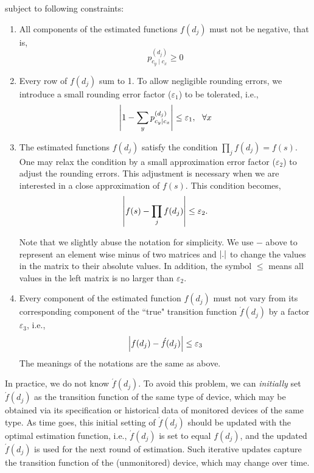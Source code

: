 subject to following constraints:
\begin{enumerate}\itemsep0.5em
\item All components of the estimated functions $f(d_j)$ must not be negative, that is,
\begin{equation}
 p_{c_y \mid c_x}^{(d_j)} \geq 0
\end{equation}
\item Every row of $f(d_j)$ sum to 1. To allow negligible rounding errors, we introduce a small rounding error factor ($\varepsilon_1$) to be tolerated, i.e., 
\begin{equation}
	\left| 1 - \sum_y  p_{c_y \mid c_x}^{(d_j)} \right| \leq \varepsilon_1, \ \ \forall x \label{cons2}
\end{equation}

\item The estimated functions $f(d_j)$ satisfy the condition $\prod_j f(d_j) = f(s)$. One may relax the condition by a small approximation error factor ($\varepsilon_2$) to adjust the rounding errors. This adjustment is necessary when we are interested in a close approximation of $f(s)$. This condition becomes,
\begin{equation}
\left| f(s) - \prod_j f(d_j) \right| \leq \varepsilon_2. \label{con3}
\end{equation}

Note that we slightly abuse the notation for simplicity. We use $-$ above to represent an element wise minus of two matrices and $\left|.\right|$ to change the values in the matrix to their absolute values. In addition, the symbol $\leq$ means all values in the left matrix is no larger than $\varepsilon_2$.

\item Every component of the estimated function $f(d_j)$ must not vary from its corresponding component of the ``true" transition function $\acute{f}(d_j)$ by a factor $\varepsilon_3$, i.e.,
\begin{equation}
\left| f(d_j) - \acute{f}(d_j)\right| \leq \varepsilon_3 \label{con4}
\end{equation}
The meanings of the notations are the same as above.
\end{enumerate}

\begin{remark}
In practice, we do not know $\acute{f}(d_j)$. To avoid this problem, we can \textit{initially} set $\acute{f}(d_j)$ as the transition function of the same type of device, which may be obtained via its specification or historical data of monitored devices of the same type. As time goes, this initial setting of $\acute{f}(d_j)$ should be updated with the optimal estimation function, i.e., $\acute{f}(d_j)$ is set to equal $f(d_j)$, and the updated $\acute{f}(d_j)$ is used for the next round of estimation. Such iterative updates capture the transition function of the (unmonitored) device, which may change over time.
\end{remark}

